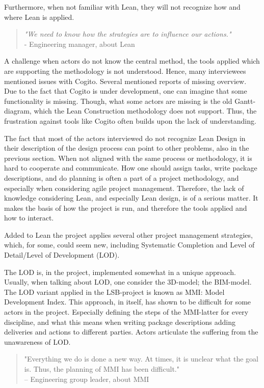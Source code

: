 Furthermore, when not familiar with Lean, they will not recognize how and where Lean is applied.

\begin{quote}
    \textit{"We need to know how the strategies are to influence our actions."} \\
    - Engineering manager, about Lean
\end{quote}

A challenge when actors do not know the central method, the tools applied which are supporting the methodology is not understood. Hence,  many interviewees mentioned issues with Cogito. Several mentioned reports of missing overview. Due to the fact that Cogito is under development, one can imagine that some functionality is missing. Though,  what some actors are missing is the old Gantt-diagram, which the Lean Construction methodology does not support. Thus, the frustration against tools like Cogito often builds upon the lack of understanding. 

The fact that most of the actors interviewed do not recognize Lean Design in their description of the design process can point to other problems, also in the previous section. When not aligned with the same process or methodology, it is hard to cooperate and communicate. How one should assign tasks, write package descriptions, and do planning is often a part of a project methodology, and especially when considering agile project management. Therefore, the lack of knowledge considering Lean, and especially Lean design, is of a serious matter. It makes the basis of how the project is run, and therefore the tools applied and how to interact.

Added to Lean the project applies several other project management strategies, which, for some, could seem new, including Systematic Completion and Level of Detail/Level of Development (LOD).  

The LOD is, in the project, implemented somewhat in a unique approach. Usually, when talking about LOD, one consider the 3D-model; the BIM-model. The LOD variant applied in the LSB-project is known as MMI: Model Development Index. This approach, in itself, has shown to be difficult for some actors in the project. Especially defining the steps of the MMI-latter for every discipline, and what this means when writing package descriptions adding deliveries and actions to different parties. Actors articulate the suffering from the unawareness of LOD. 
\begin{quote}
    "Everything we do is done a new way. At times, it is unclear what the goal is. Thus, the planning of MMI has been difficult." \\
    – Engineering group leader, about MMI
\end{quote}
 
